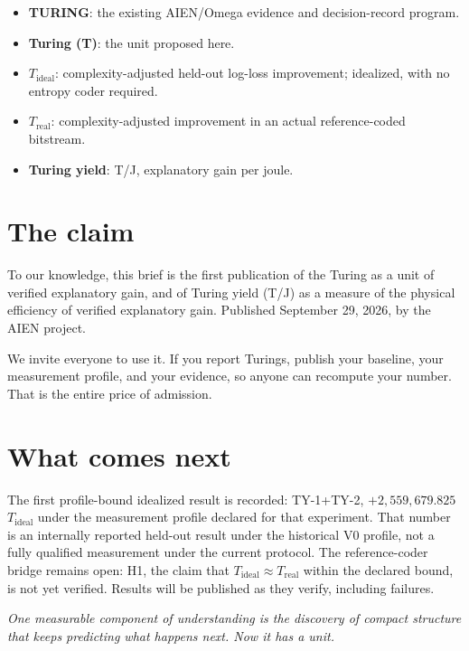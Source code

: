\documentclass[11pt,letterpaper]{article}
\begin{document}
\begin{itemize}[leftmargin=*]
\item \textbf{TURING}: the existing AIEN/Omega evidence and decision-record program.
\item \textbf{Turing (T)}: the unit proposed here.
\item \textbf{$T_{\mathrm{ideal}}$}: complexity-adjusted held-out log-loss improvement; idealized, with no entropy coder required.
\item \textbf{$T_{\mathrm{real}}$}: complexity-adjusted improvement in an actual reference-coded bitstream.
\item \textbf{Turing yield}: T/J, explanatory gain per joule.
\end{itemize}

\section{The claim}

To our knowledge, this brief is the first publication of the Turing as a unit of verified explanatory gain, and of Turing yield (T/J) as a measure of the physical efficiency of verified explanatory gain. Published September 29, 2026, by the AIEN project.

We invite everyone to use it. If you report Turings, publish your baseline, your measurement profile, and your evidence, so anyone can recompute your number. That is the entire price of admission.

\section{What comes next}

The first profile-bound idealized result is recorded: TY-1+TY-2, $+2{,}559{,}679.825$ $T_{\mathrm{ideal}}$ under the measurement profile declared for that experiment. That number is an internally reported held-out result under the historical V0 profile, not a fully qualified measurement under the current protocol. The reference-coder bridge remains open: H1, the claim that $T_{\mathrm{ideal}} \approx T_{\mathrm{real}}$ within the declared bound, is not yet verified. Results will be published as they verify, including failures.

\bigskip
\noindent\textit{One measurable component of understanding is the discovery of compact structure that keeps predicting what happens next. Now it has a unit.}
\end{document}
